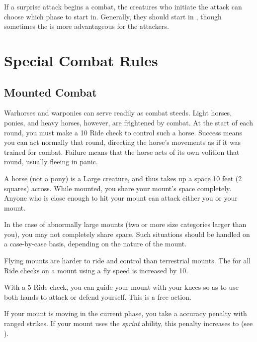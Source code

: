         If a surprise attack begins a combat, the creatures who initiate the attack can choose which phase to start in.
        Generally, they should start in , though sometimes the  is more advantageous for the attackers.

\section{Special Combat Rules}

    \subsection{Mounted Combat}\label{Mounted Combat}
         Warhorses and warponies can serve readily as combat steeds. Light horses, ponies, and heavy horses, however, are frightened by combat.
        At the start of each round, you must make a  10 Ride check to control such a horse.
        Success means you can act normally that round, directing the horse's movements as if it was trained for combat.
        Failure means that the horse acts of its own volition that round, usually fleeing in panic.

         A horse (not a pony) is a Large creature, and thus takes up a space 10 feet (2 squares) across. While mounted, you share your mount's space completely. Anyone who is close enough to hit your mount can attack either you or your mount.

        In the case of abnormally large mounts (two or more size categories larger than you), you may not completely share space. Such situations should be handled on a case-by-case basis, depending on the nature of the mount.

         Flying mounts are harder to ride and control than terrestrial mounts.
        The  for all Ride checks on a mount using a fly speed is increased by 10.

         With a  5 Ride check, you can guide your mount with your knees so as to use both hands to attack or defend yourself. This is a free action.

        If your mount is moving in the current phase, you take a  accuracy penalty with ranged strikes.
        If your mount uses the \textit{sprint} ability, this penalty increases to  (see ).

